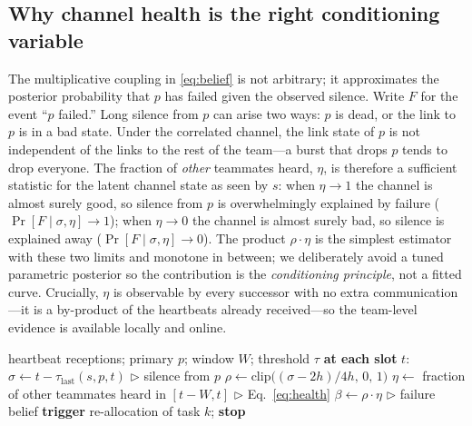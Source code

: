 \documentclass[conference]{IEEEtran}
\begin{document}
\subsection{Why channel health is the right conditioning variable}
The multiplicative coupling in \eqref{eq:belief} is not arbitrary; it
approximates the posterior probability that $p$ has failed given the observed
silence. Write $F$ for the event ``$p$ failed.'' Long silence from $p$ can arise
two ways: $p$ is dead, or the link to $p$ is in a bad state. Under the
correlated channel, the link state of $p$ is not independent of the links to the
rest of the team---a burst that drops $p$ tends to drop everyone. The fraction
of \emph{other} teammates heard, $\eta$, is therefore a sufficient statistic for
the latent channel state as seen by $s$: when $\eta\!\to\!1$ the channel is
almost surely good, so silence from $p$ is overwhelmingly explained by failure
($\Pr[F\mid\sigma,\eta]\!\to\!1$); when $\eta\!\to\!0$ the channel is almost
surely bad, so silence is explained away ($\Pr[F\mid\sigma,\eta]\!\to\!0$). The
product $\rho\cdot\eta$ is the simplest estimator with these two limits and
monotone in between; we deliberately avoid a tuned parametric posterior so the
contribution is the \emph{conditioning principle}, not a fitted curve. Crucially,
$\eta$ is observable by every successor with no extra communication---it is a
by-product of the heartbeats already received---so the team-level evidence is
available locally and online.

\begin{algorithm}[t]
\caption{Channel-aware takeover decision (run by successor $s$ for task $k$)}
\label{alg:detect}
\begin{algorithmic}[1]
\REQUIRE heartbeat receptions; primary $p$; window $W$; threshold $\tau$
\STATE \textbf{at each slot } $t$:
\STATE $\sigma \gets t - \tau_{\text{last}}(s,p,t)$
       \hfill$\triangleright$ silence from $p$
\STATE $\rho \gets \mathrm{clip}\big((\sigma-2h)/4h,\,0,\,1\big)$
\STATE $\eta \gets$ fraction of other teammates heard in $[t-W,t]$
       \hfill$\triangleright$ Eq.~\eqref{eq:health}
\STATE $\beta \gets \rho\cdot\eta$ \hfill$\triangleright$ failure belief
\IF{$\beta \ge \tau$}
    \STATE \textbf{trigger} re-allocation of task $k$; \textbf{stop}
\ENDIF
\end{algorithmic}
\end{algorithm}
\end{document}
